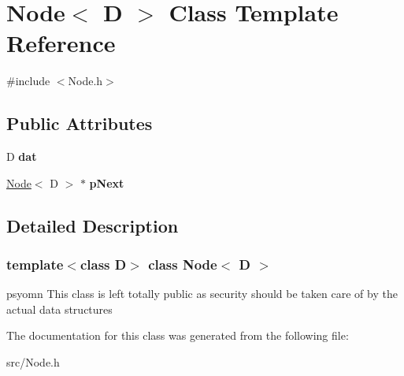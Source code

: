 \hypertarget{classNode}{
\section{Node$<$ D $>$ Class Template Reference}
\label{classNode}
}


{\ttfamily \#include $<$Node.h$>$}

\subsection*{Public Attributes}
\begin{DoxyCompactItemize}
\item 
\hypertarget{classNode_a858f87afbc37bc1cecdd14ec4b4cc6ae}{
D {\bfseries dat}}
\label{classNode_a858f87afbc37bc1cecdd14ec4b4cc6ae}

\item 
\hypertarget{classNode_a8df473844795a6494445928196f47f2c}{
\hyperlink{classNode}{Node}$<$ D $>$ $\ast$ {\bfseries pNext}}
\label{classNode_a8df473844795a6494445928196f47f2c}

\end{DoxyCompactItemize}


\subsection{Detailed Description}
\subsubsection*{template$<$class D$>$ class Node$<$ D $>$}

psyomn This class is left totally public as security should be taken care of by the actual data structures 

The documentation for this class was generated from the following file:\begin{DoxyCompactItemize}
\item 
src/Node.h\end{DoxyCompactItemize}
